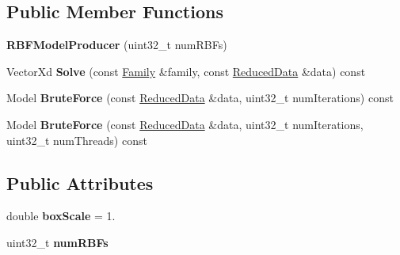 \subsection*{Public Member Functions}
\begin{DoxyCompactItemize}
\item 
\hypertarget{struct_d_r_d_s_p_1_1_r_b_f_model_producer_abdbffa9162638d17b258fd2af9e867b1}{{\bfseries R\-B\-F\-Model\-Producer} (uint32\-\_\-t num\-R\-B\-Fs)}\label{struct_d_r_d_s_p_1_1_r_b_f_model_producer_abdbffa9162638d17b258fd2af9e867b1}

\item 
\hypertarget{struct_d_r_d_s_p_1_1_r_b_f_model_producer_a16280fd8b2c90a7f1781c36083a8eb8c}{Vector\-Xd {\bfseries Solve} (const \hyperlink{struct_d_r_d_s_p_1_1_family}{Family} \&family, const \hyperlink{struct_d_r_d_s_p_1_1_reduced_data}{Reduced\-Data} \&data) const }\label{struct_d_r_d_s_p_1_1_r_b_f_model_producer_a16280fd8b2c90a7f1781c36083a8eb8c}

\item 
\hypertarget{struct_d_r_d_s_p_1_1_r_b_f_model_producer_aaf6069ba29bae98424669eedaabd33c5}{Model {\bfseries Brute\-Force} (const \hyperlink{struct_d_r_d_s_p_1_1_reduced_data}{Reduced\-Data} \&data, uint32\-\_\-t num\-Iterations) const }\label{struct_d_r_d_s_p_1_1_r_b_f_model_producer_aaf6069ba29bae98424669eedaabd33c5}

\item 
\hypertarget{struct_d_r_d_s_p_1_1_r_b_f_model_producer_ad102d9f22c3052a72989f7725cffe687}{Model {\bfseries Brute\-Force} (const \hyperlink{struct_d_r_d_s_p_1_1_reduced_data}{Reduced\-Data} \&data, uint32\-\_\-t num\-Iterations, uint32\-\_\-t num\-Threads) const }\label{struct_d_r_d_s_p_1_1_r_b_f_model_producer_ad102d9f22c3052a72989f7725cffe687}

\end{DoxyCompactItemize}
\subsection*{Public Attributes}
\begin{DoxyCompactItemize}
\item 
\hypertarget{struct_d_r_d_s_p_1_1_r_b_f_model_producer_aca502a665ad3805c1e879dfa98966414}{double {\bfseries box\-Scale} = 1.}\label{struct_d_r_d_s_p_1_1_r_b_f_model_producer_aca502a665ad3805c1e879dfa98966414}

\item 
\hypertarget{struct_d_r_d_s_p_1_1_r_b_f_model_producer_a9734043452d4409fbe078ecad8299b33}{uint32\-\_\-t {\bfseries num\-R\-B\-Fs}}\label{struct_d_r_d_s_p_1_1_r_b_f_model_producer_a9734043452d4409fbe078ecad8299b33}

\end{DoxyCompactItemize}
